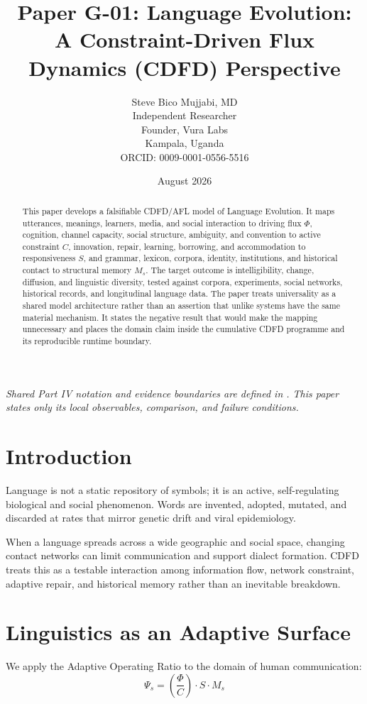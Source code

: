 \documentclass[11pt,a4paper]{article}
\title{\textbf{Paper G-01: Language Evolution:\\ A Constraint-Driven Flux Dynamics (CDFD) Perspective}}
\author{Steve Bico Mujjabi, MD\\
\small Independent Researcher\\
\small Founder, Vura Labs\\
\small Kampala, Uganda\\
\small ORCID: 0009-0001-0556-5516}
\date{August 2026}
\begin{document}
\maketitle

\noindent\textit{Shared Part IV notation and evidence boundaries are defined in . This paper states only its local observables, comparison, and failure conditions.}


\begin{abstract}
This paper develops a falsifiable CDFD/AFL model of Language Evolution. It maps utterances, meanings, learners, media, and social interaction to driving flux $\Phi$, cognition, channel capacity, social structure, ambiguity, and convention to active constraint $C$, innovation, repair, learning, borrowing, and accommodation to responsiveness $S$, and grammar, lexicon, corpora, identity, institutions, and historical contact to structural memory $M_s$. The target outcome is intelligibility, change, diffusion, and linguistic diversity, tested against corpora, experiments, social networks, historical records, and longitudinal language data. The paper treats universality as a shared model architecture rather than an assertion that unlike systems have the same material mechanism. It states the negative result that would make the mapping unnecessary and places the domain claim inside the cumulative CDFD programme and its reproducible runtime boundary.
\end{abstract}

\section{Introduction}

Language is not a static repository of symbols; it is an active, self-regulating biological and social phenomenon. Words are invented, adopted, mutated, and discarded at rates that mirror genetic drift and viral epidemiology.

When a language spreads across a wide geographic and social space, changing contact networks can limit communication and support dialect formation. CDFD treats this as a testable interaction among information flow, network constraint, adaptive repair, and historical memory rather than an inevitable breakdown.

\section{Linguistics as an Adaptive Surface}
We apply the Adaptive Operating Ratio to the domain of human communication:
\begin{equation}
    \Psi_s = \left( \frac{\Phi}{C} \right) \cdot S \cdot M_s
\end{equation}
\end{document}
